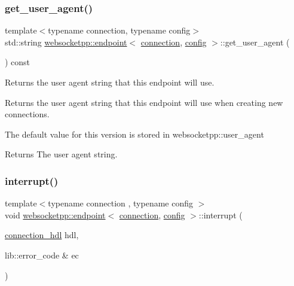 \subsubsection{\texorpdfstring{get\+\_\+user\+\_\+agent()}{get\_user\_agent()}}
{\footnotesize\ttfamily template$<$typename connection, typename config$>$ \\
std\+::string \mbox{\hyperlink{classwebsocketpp_1_1endpoint}{websocketpp\+::endpoint}}$<$ \mbox{\hyperlink{classwebsocketpp_1_1connection}{connection}}, \mbox{\hyperlink{classconfig}{config}} $>$\+::get\+\_\+user\+\_\+agent (\begin{DoxyParamCaption}{ }\end{DoxyParamCaption}) const\hspace{0.3cm}{\ttfamily [inline]}}



Returns the user agent string that this endpoint will use. 

Returns the user agent string that this endpoint will use when creating new connections.

The default value for this version is stored in websocketpp\+::user\+\_\+agent

\begin{DoxyReturn}{Returns}
The user agent string. 
\end{DoxyReturn}
\mbox{\label{classwebsocketpp_1_1endpoint_ab6cd8d850c40f33f48d0afb4d7be094c}} 
\subsubsection{\texorpdfstring{interrupt()}{interrupt()}}
{\footnotesize\ttfamily template$<$typename connection , typename config $>$ \\
void \mbox{\hyperlink{classwebsocketpp_1_1endpoint}{websocketpp\+::endpoint}}$<$ \mbox{\hyperlink{classwebsocketpp_1_1connection}{connection}}, \mbox{\hyperlink{classconfig}{config}} $>$\+::interrupt (\begin{DoxyParamCaption}\item[{\mbox{\hyperlink{namespacewebsocketpp_a6b3d26a10ee7229b84b776786332631d}{connection\+\_\+hdl}}}]{hdl,  }\item[{lib\+::error\+\_\+code \&}]{ec }\end{DoxyParamCaption})}

